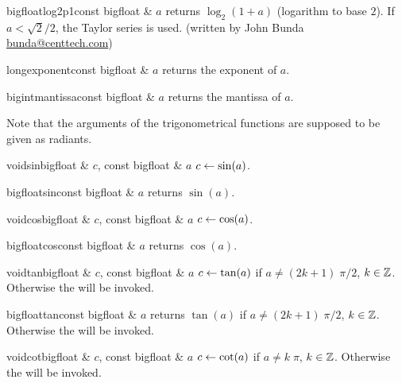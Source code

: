 \begin{fcode}{bigfloat}{log2p1}{const bigfloat & $a$}
  returns $\log_2(1+a)$ (logarithm to base $2$).  If $a < \sqrt2/2$, the Taylor series is used.
  (written by John Bunda \url{bunda@centtech.com})
\end{fcode}

\begin{fcode}{long}{exponent}{const bigfloat & $a$}
  returns the exponent of $a$.
\end{fcode}

\begin{fcode}{bigint}{mantissa}{const bigfloat & $a$}
  returns the mantissa of $a$.
\end{fcode}




Note that the arguments of the trigonometrical functions are supposed to be given as radiants.


\begin{fcode}{void}{sin}{bigfloat & $c$, const bigfloat & $a$}
  $c \leftarrow \sin(a)$.
\end{fcode}

\begin{fcode}{bigfloat}{sin}{const bigfloat & $a$}
  returns $\sin(a)$.
\end{fcode}

\begin{fcode}{void}{cos}{bigfloat & $c$, const bigfloat & $a$}
  $c \leftarrow \cos(a)$.
\end{fcode}

\begin{fcode}{bigfloat}{cos}{const bigfloat & $a$}
  returns $\cos(a)$.
\end{fcode}

\begin{fcode}{void}{tan}{bigfloat & $c$, const bigfloat & $a$}
  $c \leftarrow \tan(a)$ if $a \neq (2k+1)\;\pi/2$, $k \in \mathbb{Z}$.  Otherwise the \LEH will be invoked.
\end{fcode}

\begin{fcode}{bigfloat}{tan}{const bigfloat & $a$}
  returns $\tan(a)$ if $a \neq (2k+1)\;\pi/2$, $k \in \mathbb{Z}$.  Otherwise the \LEH will be
  invoked.
\end{fcode}

\begin{fcode}{void}{cot}{bigfloat & $c$, const bigfloat & $a$}
  $c \leftarrow \cot(a)$ if $a \neq k\;\pi$, $k \in \mathbb{Z}$.  Otherwise the \LEH will be invoked.
\end{fcode}

